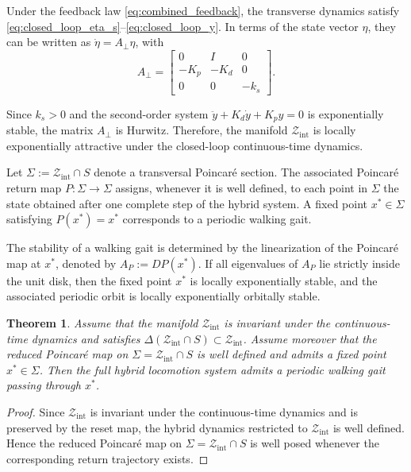 \documentclass[letterpaper, 10 pt, conference]{ieeeconf}
\newtheorem{theorem}{Theorem}
\begin{document}
{Under the feedback law \eqref{eq:combined_feedback}, the transverse dynamics satisfy \eqref{eq:closed_loop_eta_s}--\eqref{eq:closed_loop_y}. In terms of the state vector $\eta$, they can be written as $\dot\eta = A_\perp \eta$, with
\[
A_\perp =
\begin{bmatrix}
0 & I & 0 \\
-K_p & -K_d & 0 \\
0 & 0 & -k_s
\end{bmatrix}.
\]

Since $k_s>0$ and the second-order system $\ddot y+K_d\dot y+K_p y=0$ is exponentially stable, the matrix $A_\perp$ is Hurwitz. Therefore, the manifold $\mathcal Z_{\mathrm{int}}$ is locally exponentially attractive under the closed-loop continuous-time dynamics.


Let $\Sigma := \mathcal Z_{\mathrm{int}} \cap S$ denote a transversal Poincaré section. The associated Poincaré return map $P:\Sigma \to \Sigma$ assigns, whenever it is well defined, to each point in $\Sigma$ the state obtained after one complete step of the hybrid system. A fixed point $x^\ast \in \Sigma$ satisfying $P(x^\ast)=x^\ast$ corresponds to a periodic walking gait.

The stability of a walking gait is determined by the linearization of the Poincaré map at $x^\ast$, denoted by $A_P := DP(x^\ast)$. If all eigenvalues of $A_P$ lie strictly inside the unit disk, then the fixed point $x^\ast$ is locally exponentially stable, and the associated periodic orbit is locally exponentially orbitally stable.

\begin{theorem}
Assume that the manifold $\mathcal Z_{\mathrm{int}}$ is invariant under the continuous-time dynamics and satisfies $\Delta(\mathcal Z_{\mathrm{int}}\cap S)\subset \mathcal Z_{\mathrm{int}}$. Assume moreover that the reduced Poincaré map on $\Sigma=\mathcal Z_{\mathrm{int}}\cap S$ is well defined and admits a fixed point $x^\ast\in\Sigma$.
Then the full hybrid locomotion system admits a periodic walking gait passing through $x^\ast$.
\end{theorem}

\begin{proof}
Since $\mathcal Z_{\mathrm{int}}$ is invariant under the continuous-time dynamics and is preserved by the reset map, the hybrid dynamics restricted to $\mathcal Z_{\mathrm{int}}$ is well defined. Hence the reduced Poincaré map on $\Sigma=\mathcal Z_{\mathrm{int}}\cap S$ is well posed whenever the corresponding return trajectory exists.


\end{proof}}
\end{document}
